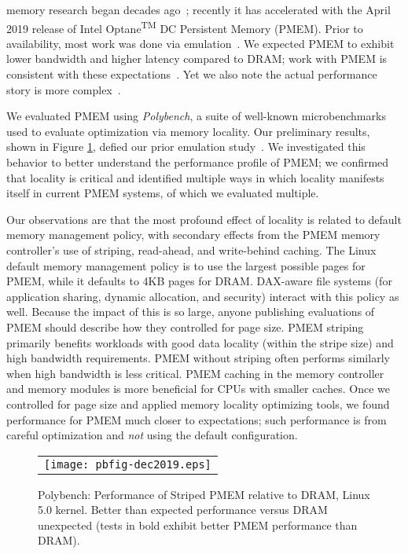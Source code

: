  memory research began decades ago~\cite{wu1994envy}; recently it has accelerated with the April 2019 release of Intel Optane\textsuperscript{\tiny TM} DC Persistent Memory (PMEM). Prior to availability, most work was done via emulation~\cite{wu1994envy,Maciejewski2017persistent,dulloor2014system,volos2015quartz,doudali2017comerge}.  We expected PMEM to exhibit lower bandwidth and higher latency compared to DRAM; work with PMEM is consistent with these expectations~\cite{gill2019single,izraelevitz2019basic}.  Yet we also note the actual performance story is more complex~\cite{peng2019system}. 

We evaluated PMEM using \textit{Polybench}, a suite of well-known microbenchmarks used to evaluate optimization via memory locality.  Our preliminary results, shown in Figure \ref{fig:polybench}, defied our prior emulation study~\cite{doudali2017comerge}.  We investigated this behavior to better understand the performance profile of PMEM; we confirmed that locality is critical and identified multiple ways in which locality manifests itself in current PMEM systems, of which we evaluated multiple.

Our observations are that the most profound effect of locality is related to default memory management policy, with secondary effects from the PMEM memory controller's use of striping, read-ahead, and write-behind caching.  The Linux default memory management policy is to use the largest possible pages for PMEM, while it defaults to 4KB pages for DRAM.  DAX-aware file systems (for application sharing, dynamic allocation, and security) interact with this policy as well.  Because the impact of this is so large, anyone publishing evaluations of PMEM should describe how they controlled for page size. PMEM striping primarily benefits workloads with good data locality (within the stripe size) and high bandwidth requirements.  PMEM without striping often performs similarly when high bandwidth is less critical.  PMEM caching in the memory controller and memory modules is more beneficial for CPUs with smaller caches.  Once we controlled for page size and applied memory locality optimizing tools, we found performance for PMEM much closer to expectations; such performance is from careful optimization and \textit{not} using the default configuration.

\begin{figure}[!hb]
    \captionsetup{justification=centering}
    \centering
    \caption{Polybench: Performance of Striped PMEM relative to DRAM, Linux 5.0 kernel.  Better than expected performance versus DRAM unexpected (tests in bold exhibit better PMEM performance than DRAM).}
    \vspace{0.1cm}
    \label{fig:polybench}
    \begin{tabular}{c}
        \texttt{[image: pbfig-dec2019.eps]}
    \end{tabular}
\end{figure}

 

